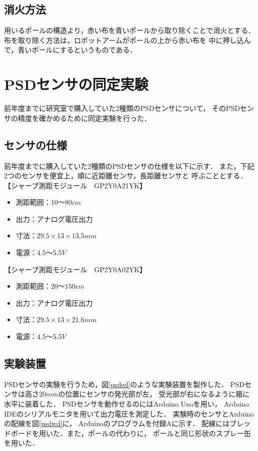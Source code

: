 \documentclass[10pt,a4j]{jarticle}
\begin{document}
\subsection{消火方法}
用いるポールの構造より，赤い布を青いポールから取り除くことで消火とする．
布を取り除く方法は，ロボットアームがポールの上から赤い布を
中に押し込んで，青いポールにするというものである．





\section{PSDセンサの同定実験}
\label{psdex}

前年度までに研究室で購入していた2種類のPSDセンサについて，
そのPSDセンサの精度を確かめるために同定実験を行った．

\subsection{センサの仕様}
前年度までに購入していた2種類のPSDセンサの仕様を以下に示す．
また，下記2つのセンサを便宜上，順に近距離センサ，長距離センサと
呼ぶこととする．\\

【シャープ測距モジュール　GP2Y0A21YK】
  \begin{itemize}
   \item 測距範囲：$10〜80\unit{cm}$
   \item 出力：アナログ電圧出力
   \item 寸法：$29.5×13×13.5\unit{mm}$
   \item 電源：$4.5〜5.5\unit{V}$\\
  \end{itemize}

【シャープ測距モジュール　GP2Y0A02YK】
  \begin{itemize}
   \item 測距範囲：$20〜150\unit{cm}$
   \item 出力：アナログ電圧出力
   \item 寸法：$29.5×13×21.6\unit{mm}$
   \item 電源：$4.5〜5.5\unit{V}$
  \end{itemize}

\subsection{実験装置}
PSDセンサの実験を行うため，図\ref{psded}のような実験装置を製作した．
PSDセンサは高さ$20\unit{mm}$の位置にセンサの発光部が左，
受光部が右になるように箱に水平に装着した．
PSDセンサを動作せるのにはArduino Unoを用い，
Arduino IDEのシリアルモニタを用いて出力電圧を測定した．
実験時のセンサとArduinoの配線を図\ref{psdwd}に，
Arduinoのプログラムを付録Aに示す．
配線にはブレッドボードを用いた．また，ポールの代わりに，
ポールと同じ形状のスプレー缶を用いた．
\end{document}
